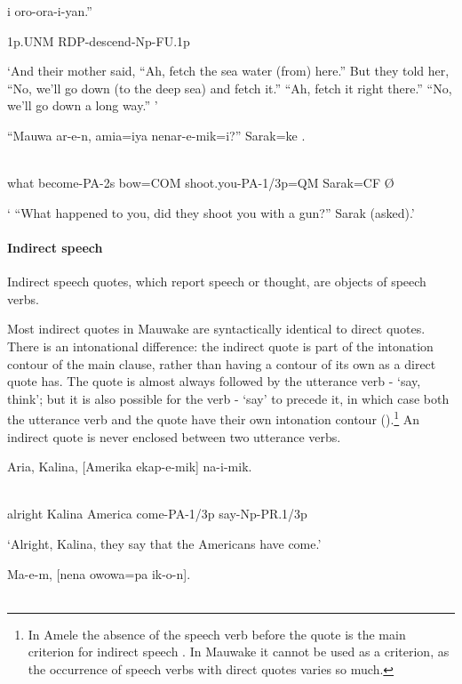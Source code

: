 i  oro-ora-i-yan.''

1p.UNM  RDP-descend-Np-FU.1p

`And their mother said, ``Ah, fetch the sea water (from) here.'' But they told her, ``No, we'll go down (to the deep sea) and fetch it.'' ``Ah, fetch it right there.'' ``No, we'll go down a long way.'' '

\ea%
\label{ex:x1582}
\gll ``Mauwa  ar-e-n,  amia=iya  nenar-e-mik=i?''  Sarak=ke  \textstyleEmphasizedVernacularWords{{\O}}. \\
      \\
\glt
\z

what  become-PA-2s  bow=COM  shoot.you-PA-1/3p=QM  Sarak=CF  {\O}

` ``What happened to you, did they shoot you with a gun?'' Sarak (asked).'

\paragraph[Indirect speech]{Indirect speech}
\hypertarget{RefHeading23461935131865}{}
Indirect speech quotes, which report speech or thought, are objects of speech verbs. 

Most indirect quotes in Mauwake are syntactically identical to direct quotes. There is an intonational difference: the indirect quote is part of the intonation contour of the main clause, rather than having a contour of its own as a direct quote has. The quote is almost always followed by the utterance verb - `say, think'; but it is also possible for the verb - `say' to precede it, in which case both the utterance verb and the quote have their own intonation contour ().\footnote{In Amele the absence of the speech verb before the quote is the main criterion for indirect speech \citep[14]{Roberts1987}. In Mauwake it cannot be used as a criterion, as the occurrence of speech verbs with direct quotes varies so much.} An indirect quote is never enclosed between two utterance verbs. 

\ea%
\label{ex:x1585}
\gll Aria,  Kalina,  [Amerika  ekap-e-mik]  na-i-mik. \\
      \\
\glt
\z

alright  Kalina  America  come-PA-1/3p  say-Np-PR.1/3p

`Alright, Kalina, they say that the Americans have come.'

\ea%
\label{ex:x1587}
\gll Ma-e-m,  [nena  owowa=pa  ik-o-n]. \\
      \\
\glt
\z

